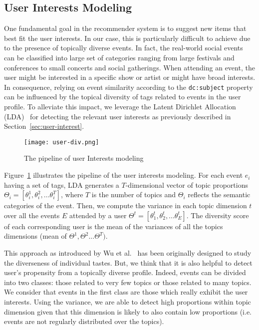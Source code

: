 \subsection{User Interests Modeling}
One fundamental goal in the recommender system is to suggest new items that best fit the user interests. In our case, this is particularly difficult to achieve due to the presence of topically diverse events. In fact, the real-world social events can be classified into large set of categories ranging from large festivals and conferences to small concerts and social gatherings. When attending an event, the user might be interested in a specific show or artist or might have broad interests. In consequence, relying on event similarity according to the \texttt{dc:subject} property can be influenced by the topical diversity of tags related to events in the user profile. To alleviate this impact, we leverage the Latent Dirichlet Allocation (LDA)~\cite{Blei:MLR03} for detecting the relevant user interests as previously described in Section~\ref{sec:user-interest}.

\begin{figure}[htb]
  \centering
  \texttt{[image: user-div.png]}
  \caption{The pipeline of user Interests modeling}
  \label{fig:div-approach}
\end{figure}

Figure~\ref{fig:div-approach} illustrates the pipeline of the user interests modeling. For each event $e_{i}$ having a set of tags, LDA generates a $T$-dimensional vector of topic proportions $\Theta_{i} = [\theta^{1}_{i},\theta^{2}_{i},...\theta^{T}_{i}]$, where $T$ is the number of topics and $\Theta_{i}$ reflects the semantic categories of the event. Then, we compute the variance in each topic dimension $t$ over all the events $E$ attended by a user $\Theta^{t} = [\theta^{t}_{1},\theta^{t}_{2},...\theta^{t}_{E}]$. The diversity score of each corresponding user is the mean of the variances of all the topics dimensions (mean of $\Theta^{1},\Theta^{2}...\Theta^{T})$. 

This approach as introduced by Wu et al.~\cite{Hao:AHJ12} has been originally designed to study the diverseness of individual tastes. But, we think that it is also helpful to detect user's propensity from a topically diverse profile. Indeed, events can be divided into two classes: those related to very few topics or those related to many topics. We consider that events in the first class are those which really exhibit the user interests. Using the variance, we are able to detect high proportions within topic dimension given that this dimension is likely to also contain low proportions (i.e. events are not regularly distributed over the topics).


